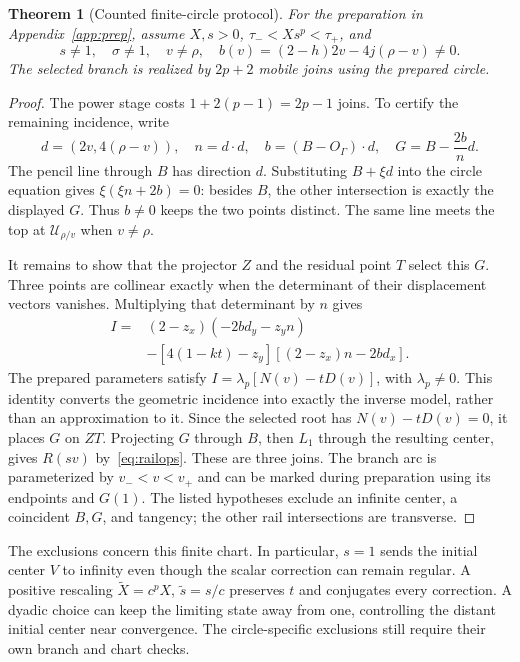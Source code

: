\documentclass[11pt,a4paper]{article}
\newtheorem{theorem}{Theorem}[section]\newtheorem{proposition}[theorem]{Proposition}
\newcommand{\hub}[1]{\mathcal U_{#1}}
\begin{document}
\begin{theorem}[Counted finite-circle protocol]\label{thm:construction}
For the preparation in Appendix~\ref{app:prep}, assume $X,s>0$, $\tau_-<Xs^p<\tau_+$, and
\[
 s\ne1,\quad \sigma\ne1,\quad v\ne\rho,\quad
 b(v)=(2-h)2v-4j(\rho-v)\ne0.
\]
The selected branch is realized by $2p+2$ mobile joins using the prepared circle.
\end{theorem}
\begin{proof}
The power stage costs $1+2(p-1)=2p-1$ joins. To certify the remaining incidence, write
\[
 d=(2v,4(\rho-v)),\quad n=d\cdot d,\quad b=(B-O_\Gamma)\cdot d,
 \quad G=B-\frac{2b}{n}d.
\]
The pencil line through $B$ has direction $d$. Substituting $B+\xi d$ into the circle equation gives $\xi(\xi n+2b)=0$: besides $B$, the other intersection is exactly the displayed $G$. Thus $b\ne0$ keeps the two points distinct. The same line meets the top at $\hub{\rho/v}$ when $v\ne\rho$.

It remains to show that the projector $Z$ and the residual point $T$ select this $G$. Three points are collinear exactly when the determinant of their displacement vectors vanishes. Multiplying that determinant by $n$ gives
\begin{align*}
 I={}&(2-z_x)(-2bd_y-z_yn)\\
 &-[4(1-kt)-z_y][(2-z_x)n-2bd_x].
\end{align*}
The prepared parameters satisfy $I=\lambda_p[N(v)-tD(v)]$, with $\lambda_p\ne0$. This identity converts the geometric incidence into exactly the inverse model, rather than an approximation to it. Since the selected root has $N(v)-tD(v)=0$, it places $G$ on $ZT$. Projecting $G$ through $B$, then $L_1$ through the resulting center, gives $R(sv)$ by~\eqref{eq:railops}. These are three joins. The branch arc is parameterized by $v_-<v<v_+$ and can be marked during preparation using its endpoints and $G(1)$. The listed hypotheses exclude an infinite center, a coincident $B,G$, and tangency; the other rail intersections are transverse.
\end{proof}
The exclusions concern this finite chart. In particular, $s=1$ sends the initial center $V$ to infinity even though the scalar correction can remain regular. A positive rescaling $\widetilde X=c^pX$, $\widetilde s=s/c$ preserves $t$ and conjugates every correction. A dyadic choice can keep the limiting state away from one, controlling the distant initial center near convergence. The circle-specific exclusions still require their own branch and chart checks.
\end{document}

